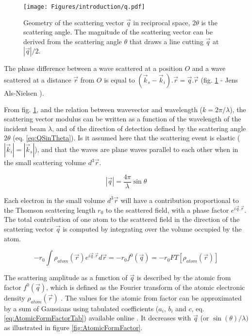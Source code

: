 \begin{figure}[!htb]
    \centering
    \texttt{[image: Figures/introduction/q.pdf]}
    \caption{
    Geometry of the scattering vector $\vec{q}$ in reciprocal space, $2\theta$ is the scattering angle.
    The magnitude of the scattering vector can be derived from the scattering angle $\theta$ that draws a line cutting $\vec{q}$ at $|\vec{q}|/2$.
    }
    \label{fig:q}
\end{figure}

The phase difference between a wave scattered at a position $O$ and a wave scattered at a distance $\vec{r}$ from $O$ is equal to $(\vec{k}_s - \vec{k}_i).\vec{r} = \vec{q}.\vec{r}$ (fig. \ref{fig:q} - Jens Als-Nielsen \cite*{NielsenMcMorrow}).

From fig. \ref{fig:q}, and the relation between wavevector and wavelength ($k = 2 \pi/\lambda$), the scattering vector modulus can be written as a function of the wavelength of the incident beam $\lambda$, and of the direction of detection defined by the scattering angle $2\theta$ (eq. \ref{eq:QSinTheta}).
Is it assumed here that the scattering event is elastic ($|\vec{k}_i|=|\vec{k}_s|$), and that the waves are plane waves parallel to each other when in the small scattering volume $d^3\vec{r}$.

\begin{equation}
    \label{eq:QSinTheta}
    |\vec{q}| = \frac{4\pi}{\lambda} \sin{\theta}
\end{equation}

Each electron in the small volume $d^3\vec{r}$ will have a contribution proportional to the Thomson scattering length $r_0$ to the scattered field, with a phase factor $e^{i\vec{q}.\vec{r}}$.
The total contribution of one atom to the scattered field in the direction of the scattering vector $\vec{q}$ is computed by integrating over the volume occupied by the atom.

\begin{equation}
    \label{eq:AtomicFormFactor}
    -r_0 \int \rho_{atom} (\vec{r}) e^{i\vec{q}.\vec{r}} d\vec{r} = -r_0 f^0(\vec{q}) = -r_0 FT [\rho_{atom} (\vec{r})]
\end{equation}

The scattering amplitude as a function of $\vec{q}$ is described by the atomic from factor $f^0(\vec{q})$, which is defined as the Fourier transform of the atomic electronic density $\rho_{atom}(\vec{r})$ \parencite{Paganin}.
The values for the atomic from factor can be approximated by a sum of Gaussians using tabulated coefficients ($a_i$, $b_i$ and $c$, eq. \ref{eq:AtomicFormFactorTab}) available online \parencite{InterTablesOfCryst}.
It decreases with $\vec{q}$ (or $\sin(\theta) / \lambda)$ as illustrated in figure \ref{fig:AtomicFormFactor}.

